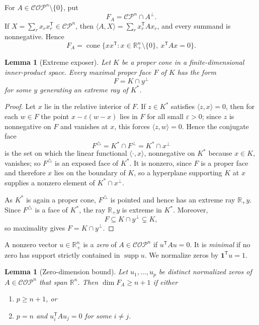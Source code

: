 \documentclass[11pt]{amsart}
\newtheorem{lemma}[theorem]{Lemma}
\theoremstyle{remark}
\newcommand{\CP}{\mathcal{CP}}
\newcommand{\COP}{\mathcal{COP}}
\newcommand{\R}{\mathbb{R}}
\newcommand{\supp}{\operatorname{supp}}
\newcommand{\cone}{\operatorname{cone}}
\newcommand{\ip}[2]{\langle #1,#2\rangle}
\begin{document}
For $A\in\COP^n\setminus\{0\}$, put
\[
F_A=\CP^n\cap A^\perp.
\]
If $X=\sum_r x_rx_r^{\mathsf T}\in\CP^n$, then
$\ip{A}{X}=\sum_r x_r^{\mathsf T}Ax_r$, and every summand is nonnegative.
Hence
\begin{equation}\label{eq:facezeros}
F_A=\cone\{xx^{\mathsf T}:x\in\R_+^n\setminus\{0\},\ x^{\mathsf T}Ax=0\}.
\end{equation}

\begin{lemma}[Extreme exposer]\label{lem:exposer}
Let $K$ be a proper cone in a finite-dimensional inner-product space.
Every maximal proper face $F$ of $K$ has the form
\[
F=K\cap y^\perp
\]
for some $y$ generating an extreme ray of $K^*$.
\end{lemma}

\begin{proof}
Let $x$ lie in the relative interior of $F$. If $z\in K^*$ satisfies
$\ip{z}{x}=0$, then for each $w\in F$ the point $x-\varepsilon(w-x)$ lies in
$F$ for all small $\varepsilon>0$; since $z$ is nonnegative on $F$ and
vanishes at $x$, this forces $\ip{z}{w}=0$. Hence the conjugate face
\[
F^\triangle=K^*\cap F^\perp=K^*\cap x^\perp
\]
is the set on which the linear functional $\ip{\cdot}{x}$, nonnegative on
$K^*$ because $x\in K$, vanishes; so $F^\triangle$ is an exposed face of
$K^*$. It is nonzero, since $F$ is a proper face and therefore $x$ lies on
the boundary of $K$, so a hyperplane supporting $K$ at $x$ supplies a
nonzero element of $K^*\cap x^\perp$.

As $K^*$ is again a proper cone, $F^\triangle$ is pointed and hence has an
extreme ray $\R_+y$. Since $F^\triangle$ is a face of
$K^*$, the ray $\R_+y$ is extreme in $K^*$. Moreover,
\[
F\subseteq K\cap y^\perp\subsetneq K,
\]
so maximality gives $F=K\cap y^\perp$.
\end{proof}

A nonzero vector $u\in\R_+^n$ is a \emph{zero} of $A\in\COP^n$ if
$u^{\mathsf T}Au=0$. It is \emph{minimal} if no zero has support strictly
contained in $\supp u$. We normalize zeros by $\mathbf1^{\mathsf T}u=1$.

\begin{lemma}[Zero-dimension bound]\label{lem:zeros}
Let $u_1,\dots,u_p$ be distinct normalized zeros of $A\in\COP^n$ that span
$\R^n$. Then $\dim F_A\ge n+1$ if either
\begin{enumerate}
\item $p\ge n+1$, or
\item $p=n$ and $u_i^{\mathsf T}Au_j=0$ for some $i\ne j$.
\end{enumerate}
\end{lemma}
\end{document}

